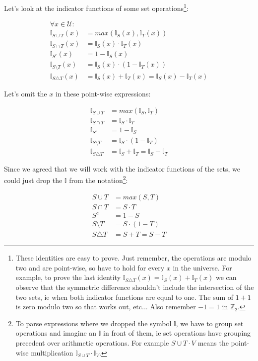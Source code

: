 Let's look at the indicator functions of some set operations\footnote{These identities are easy to prove. Just remember, the operations are modulo two and are point-wise, so have to hold for every $x$ in the universe. For example, to prove the last identity $\mathbb{I}_{S \triangle T}(x) = \mathbb{I}_S(x) + \mathbb{I}_T(x)$ we can observe that the symmetric difference shouldn't include the intersection of the two sets, ie when both indicator functions are equal to one. The sum of $1 + 1$ is zero modulo two so that works out, etc... Also remember $-1 = 1$ in $\mathbb{Z}_2$.}:

\begin{align*}
\forall x \in \mathcal{U}:\\  
\mathbb{I}_{S \cup T}(x) &= max(\mathbb{I}_S(x), \mathbb{I}_T(x)) \\
\mathbb{I}_{S \cap T}(x) &= \mathbb{I}_S(x) \cdot \mathbb{I}_T(x) \\
\mathbb{I}_{S^c}(x) &= 1 - \mathbb{I}_S(x) \\
\mathbb{I}_{S \setminus T}(x) &= \mathbb{I}_S(x) \cdot (1 - \mathbb{I}_T(x)) \\
\mathbb{I}_{S \triangle T}(x) &= \mathbb{I}_S(x) + \mathbb{I}_T(x) = \mathbb{I}_S(x) - \mathbb{I}_T(x)
\end{align*}

Let's omit the $x$ in these point-wise expressions:

\begin{align*}
\mathbb{I}_{S \cup T} &= max(\mathbb{I}_S, \mathbb{I}_T) \\
\mathbb{I}_{S \cap T} &= \mathbb{I}_S \cdot \mathbb{I}_T \\
\mathbb{I}_{S^c} &= 1 - \mathbb{I}_S \\
\mathbb{I}_{S \setminus T} &= \mathbb{I}_S \cdot (1 - \mathbb{I}_T) \\
\mathbb{I}_{S \triangle T} &= \mathbb{I}_S + \mathbb{I}_T = \mathbb{I}_S - \mathbb{I}_T
\end{align*}

Since we agreed that we will work with the indicator functions of the sets, we could just drop the $\mathbb{I}$ from the notation\footnote{To parse expressions where we dropped the symbol $\mathbb{I}$, we have to group set operations and imagine an $\mathbb{I}$ in front of them, ie set operations have grouping precedent over arithmetic operations. For example $S \cup T \cdot V$ means the point-wise multiplication $\mathbb{I}_{S \cup T} \cdot \mathbb{I}_V$.}:

\begin{align*}
S \cup T &= max(S, T) \\
S \cap T &= S \cdot T \\
S^c &= 1 - S \\
S \setminus T &= S \cdot (1 - T) \\
S \triangle T &= S + T = S - T
\end{align*}

